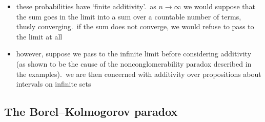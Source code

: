 \documentclass[../jaynes_prob_theory_notes.tex]{subfiles}
\begin{document}
\begin{itemize}
\begin{itemize}
                        \item these probabilities have `finite additivity'.\ as \(n \rightarrow \infty\) we would suppose that the sum goes in the limit into a sum over a countable number of terms, thusly converging.\ if the sum does not converge, we would refuse to pass to the limit at all
                        \item however, suppose we pass to the infinite limit before considering additivity (as shown to be the cause of the nonconglomerability paradox described in the examples).\ we are then concerned with additivity over propositions about intervals on infinite sets
                    \end{itemize}
            \end{itemize}

        \subsection{The Borel--Kolmogorov paradox}
\end{document}
